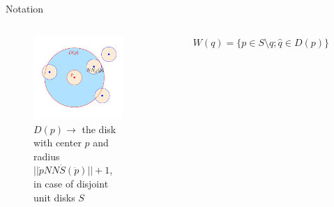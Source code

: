 \documentclass{beamer}
\begin{document}
\begin{frame}{Notation}
\begin{columns}
\begin{figure}
\centering
\includegraphics[width=1.0\textwidth]{img/diskNotation.png}
\caption{$D(p) \rightarrow $ the disk with center $p$ and radius $||\dot{p} NN\dot{S}(\dot{p})|| + 1$, in case of disjoint unit disks $S$
}
\end{figure}

\begin{figure}
		\centering
{}
\caption{$W(q) = \{p \in S \setminus {q}; \hat{q} \in D(p)\}$ }
\end{figure}


\end{columns}

\end{frame}
\end{document}
